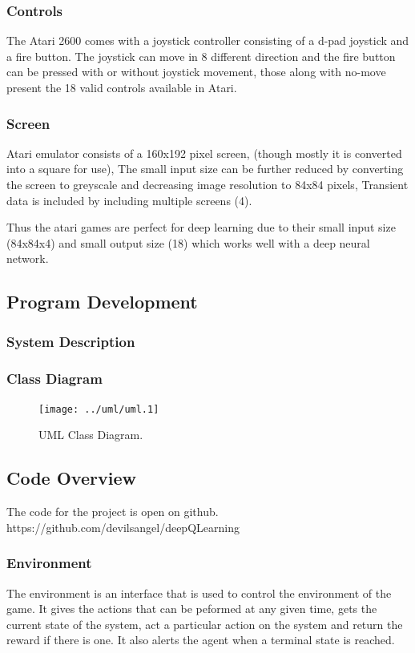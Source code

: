 \documentclass[a4paper,11pt]{article}
\begin{document}
		\subsubsection{Controls}
		The Atari 2600 comes with a joystick controller consisting of a d-pad joystick and a fire button. The joystick can move in 8 different direction and the fire button can be pressed with or without joystick movement, those along with no-move present the 18 valid controls available in Atari.

		\subsubsection{Screen}
		Atari emulator consists of a 160x192 pixel screen, (though mostly it is converted into a square for use), The small input size can be further reduced by converting the screen to greyscale and decreasing image resolution to 84x84 pixels, Transient data is included by including multiple screens (4). 

		Thus the atari games are perfect for deep learning due to their small input size (84x84x4) and small output size (18) which works well with a deep neural network.

		\subsection{Program Development}
			\subsubsection{System Description}
			\subsubsection{Class Diagram}
				\begin{figure}[!h]
					\begin{centering}
						\texttt{[image: ../uml/uml.1]}
						\caption{UML Class Diagram.}
					\end{centering}
				\end{figure}

		\subsection{Code Overview}
			The code for the project is open on github. https://github.com/devilsangel/deepQLearning

			\subsubsection{Environment}
				The environment is an interface that is used to control the environment of the game. It gives the actions that can be peformed at any given time, gets the current state of the system, act a particular action on the system and return the reward if there is one. It also alerts the agent when a terminal state is reached.
\end{document}
